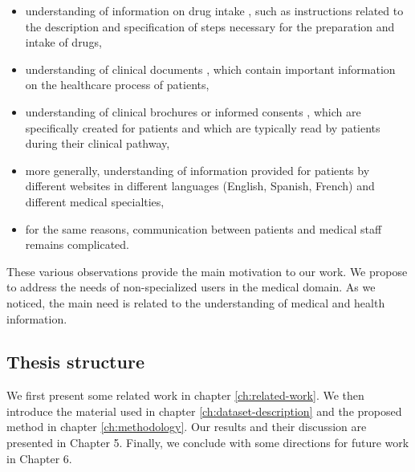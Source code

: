 \begin{itemize}
    \item  understanding of information on drug intake \citep{VanderStichele-WILEY1999,Patel-IJMI2002}, such as instructions related to the description and specification of steps necessary for the preparation and intake of drugs,
    
    \item  understanding of clinical documents \citep{Zeng-MEDINFO2007}, which contain important information on the healthcare process of patients,
    
    \item  understanding of clinical brochures or informed consents \citep{Williams-JAMA1995}, which are specifically created for patients and which are typically read by patients during their clinical pathway,
    
    \item  more generally, understanding of information provided for patients by different websites \citep{Oregon-2008,Brigo-EB2015} in different languages (English, Spanish, French) and different medical specialties,
    
    \item  for the same reasons, communication between patients and medical staff \citep{Jucks-HC2007,Tran-EC2009} remains complicated.
\end{itemize}
These various observations provide the main motivation to our work. We propose to address the needs of non-specialized users in the medical domain. As we noticed, the main need is related to the understanding of medical and health information. 

\subsection{Thesis structure}
We first present some related work in chapter \ref{ch:related-work}. We then introduce the material used in chapter \ref{ch:dataset-description} and the proposed method in chapter \ref{ch:methodology}. Our results and their discussion are presented in Chapter 5. Finally, we conclude with some directions for future work in Chapter 6.
